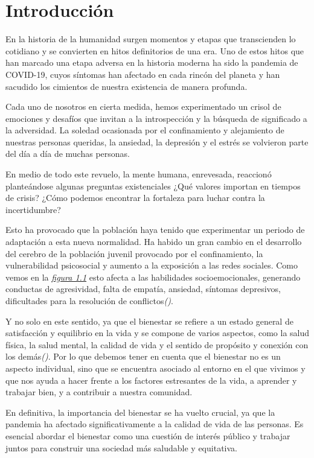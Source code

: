 \chapter{Introducción}

En la historia de la humanidad surgen momentos y etapas que transcienden lo cotidiano y se convierten en hitos definitorios de una era. Uno de estos hitos que han marcado una etapa adversa en la historia moderna ha sido la pandemia de COVID-19, cuyos síntomas han afectado en cada rincón del planeta y han sacudido los cimientos de nuestra existencia de manera profunda. 

Cada uno de nosotros en cierta medida, hemos experimentado un crisol de emociones y desafíos que invitan a la introspección y la búsqueda de significado a la adversidad. La soledad ocasionada por el confinamiento y alejamiento de nuestras personas queridas, la ansiedad, la depresión y el estrés se volvieron parte del día a día de muchas personas.

En medio de todo este revuelo, la mente humana, enrevesada, reaccionó planteándose algunas preguntas existenciales ¿Qué valores importan en tiempos de crisis? ¿Cómo podemos encontrar la fortaleza para luchar contra la incertidumbre? 

Esto ha provocado que la población haya tenido que experimentar un periodo de adaptación a esta nueva normalidad. Ha habido un gran cambio en el desarrollo del cerebro de la población juvenil provocado por el confinamiento, la vulnerabilidad psicosocial y aumento a la exposición a las redes sociales. Como vemos en la \textit{\hyperref[fig:impacto]{figura 1.1}} esto afecta a las habilidades socioemocionales, generando conductas de agresividad, falta de empatía, ansiedad, síntomas depresivos, dificultades para la resolución de conflictos\textit{(\cite{psychiatry2020})}. 

Y no solo en este sentido, ya que el bienestar se refiere a un estado general de satisfacción y equilibrio en la vida y se compone de varios aspectos, como la salud física, la salud mental, la calidad de vida y el sentido de propósito y conexión con los demás\textit{(\cite{bienestar})}. Por lo que debemos tener en cuenta que el bienestar no es un aspecto individual, sino que se encuentra asociado al entorno en el que vivimos y que nos ayuda a hacer frente a los factores estresantes de la vida, a aprender y trabajar bien, y a contribuir a nuestra comunidad.

En definitiva, la importancia del bienestar se ha vuelto crucial, ya que la pandemia ha afectado significativamente a la calidad de vida de las personas. Es esencial abordar el bienestar como una cuestión de interés público y trabajar juntos para construir una sociedad más saludable y equitativa. 

